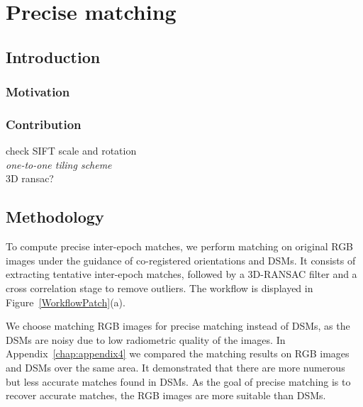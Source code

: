 
\chapter{Precise matching}
\label{chap:intro}
\minitoc

\section{Introduction}
\subsection{Motivation}
\subsection{Contribution}
check SIFT scale and rotation\\
\textit{one-to-one tiling scheme}\\
3D ransac?

\section{Methodology}
To compute precise {inter-epoch} matches, we perform matching on original RGB images {under the guidance of co-registered orientations and DSMs}. {It consists of extracting tentative inter-epoch matches, followed by a 3D-RANSAC filter and a cross correlation stage to remove outliers.} The workflow is displayed in Figure~\ref{WorkflowPatch}(a).
\par
We choose matching RGB images for precise matching instead of DSMs, as the DSMs are noisy due to low radiometric quality of the images. In Appendix~\ref{chap:appendix4} we compared the matching results on RGB images and DSMs over the same area. It demonstrated that there are more numerous but less accurate matches found in DSMs. As the goal of precise matching is to recover accurate matches, the RGB images are more suitable than DSMs.\\

